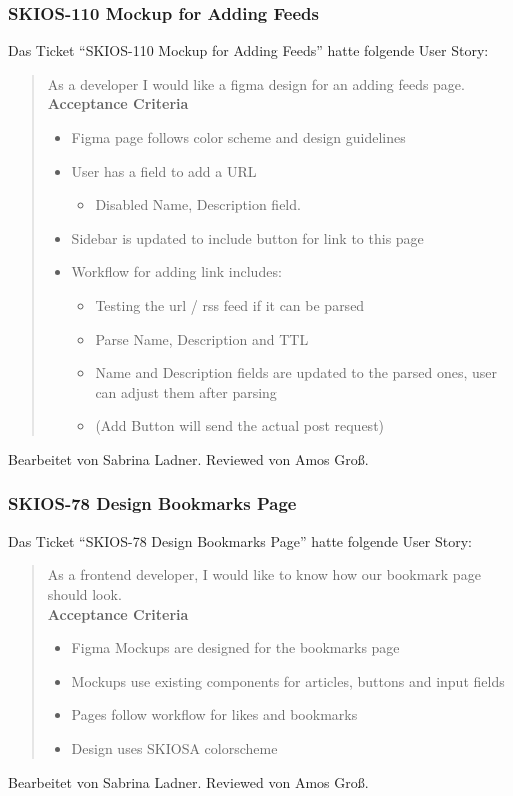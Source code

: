 \subsubsection{SKIOS-110 Mockup for Adding Feeds}
Das Ticket \enquote{SKIOS-110 Mockup for Adding Feeds} hatte folgende User Story:
\begin{quotation}
    As a developer I would like a figma design for an adding feeds page. \\
\textbf{Acceptance Criteria}
    \begin{itemize}
        \item Figma page follows color scheme and design guidelines
        \item User has a field to add a URL
        \begin{itemize}
            \item Disabled Name, Description field.
        \end{itemize}
        \item Sidebar is updated to include button for link to this page
        \item Workflow for adding link includes:
        \begin{itemize}
            \item Testing the url / rss feed if it can be parsed
            \item Parse Name, Description and TTL
            \item Name and Description fields are updated to the parsed ones, user can adjust them after parsing
            \item (Add Button will send the actual post request)
        \end{itemize}
    \end{itemize}
\end{quotation}
Bearbeitet von Sabrina Ladner.
Reviewed von Amos Groß.

\subsubsection{SKIOS-78 Design Bookmarks Page}
Das Ticket \enquote{SKIOS-78 Design Bookmarks Page} hatte folgende User Story:
\begin{quotation}
    As a frontend developer, I would like to know how our bookmark page should look. \\
\textbf{Acceptance Criteria}
    \begin{itemize}
        \item Figma Mockups are designed for the bookmarks page
        \item Mockups use existing components for articles, buttons and input fields
        \item Pages follow workflow for likes and bookmarks
        \item Design uses SKIOSA colorscheme
    \end{itemize}
\end{quotation}
Bearbeitet von Sabrina Ladner.
Reviewed von Amos Groß.

